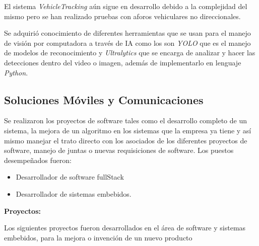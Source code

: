 \documentclass[protocolo.tex]{subfiles}
\begin{document}
\begin{enumerate}
El sistema \textit{VehicleTracking} aún sigue en desarrollo debido a la complejidad del mismo pero se han realizado pruebas con aforos vehiculares no direccionales.


Se adquirió conocimiento de diferentes herramientas que se usan para el manejo de visión por computadora a través de IA como los son \textit{YOLO} que es el manejo de modelos de reconocimiento y \textit{Ultralytics} que se encarga de analizar y hacer las detecciones dentro del video o imagen, además de implementarlo en lenguaje \textit{Python}.\vspace{5mm} 
\end{enumerate}




\subsection{Soluciones Móviles y Comunicaciones}

Se realizaron los proyectos de software tales como el desarrollo completo de un
sistema, la mejora de un algoritmo en los sistemas que la empresa ya tiene y así mismo
manejar el trato directo con los asociados de los diferentes proyectos de software, 
manejo de juntas o nuevas requisiciones de software.
Los puestos desempeñados fueron:

\begin{itemize}
\item Desarrollador de software fullStack
\item Desarrollador de sistemas embebidos.
\end{itemize}



\textbf{Proyectos:}

Los siguientes proyectos fueron desarrollados en el área de software y sistemas embebidos, para la mejora o invención de un nuevo producto
\end{document}
